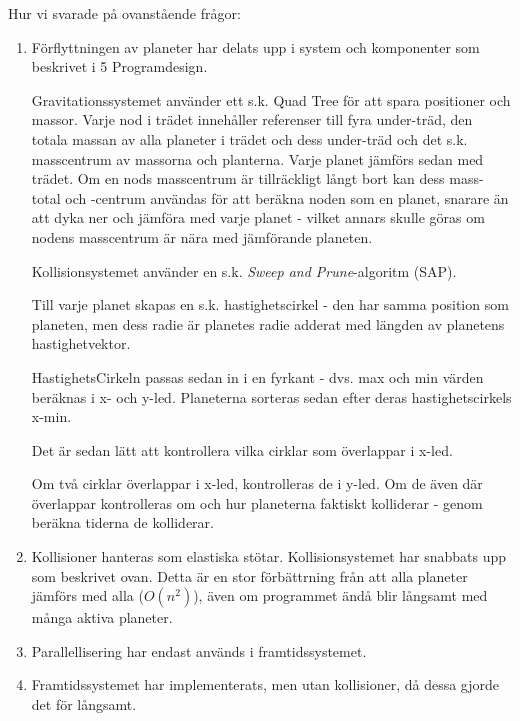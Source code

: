 
Hur vi svarade på ovanstående frågor:
\begin{enumerate}
    \item Förflyttningen av planeter har delats upp i system och komponenter
        som beskrivet i 5 Programdesign.

        \vspace{6pt}

        Gravitationssystemet använder ett s.k. Quad Tree för att
        spara positioner och massor.
        Varje nod i trädet innehåller referenser till fyra under-träd, 
        den totala massan av alla planeter i trädet och dess under-träd
        och det s.k. masscentrum av massorna och planterna.
        Varje planet jämförs sedan med trädet.
        Om en nods masscentrum är tillräckligt långt bort kan
        dess mass-total och -centrum
        användas för att beräkna noden som en planet, snarare än att
        dyka ner och jämföra med varje planet - vilket annars skulle göras
        om nodens masscentrum är nära med jämförande planeten.

        \vspace{6pt}

        Kollisionsystemet använder en s.k.
        \textit{Sweep and Prune}-algoritm (SAP).

        Till varje planet skapas en s.k. hastighetscirkel - 
        den har samma position som planeten, men dess radie
        är planetes radie adderat med längden av planetens hastighetvektor.

        HastighetsCirkeln passas sedan in i en fyrkant - dvs.
        max och min värden beräknas i x- och y-led.
        Planeterna sorteras sedan efter deras hastighetscirkels x-min.

        Det är sedan lätt att kontrollera vilka cirklar som överlappar
        i x-led.

        Om två cirklar överlappar i x-led, kontrolleras de i y-led.
        Om de även där överlappar kontrolleras om och hur
        planeterna faktiskt kolliderar - genom beräkna tiderna de kolliderar.

    \item Kollisioner hanteras som elastiska stötar.
        Kollisionsystemet har snabbats upp som beskrivet ovan.
        Detta är en stor förbättrning från att alla planeter
        jämförs med alla ($O(n^2)$), även om programmet ändå blir långsamt med
        många aktiva planeter.
    \item Parallellisering har endast används i framtidssystemet.
    \item Framtidssystemet har implementerats, men utan kollisioner,
        då dessa gjorde det för långsamt.
\end{enumerate}

